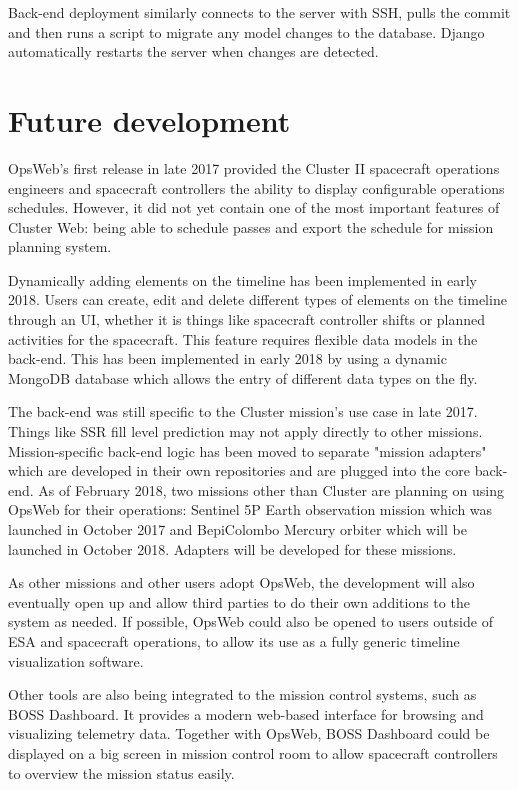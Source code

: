 Back-end deployment similarly connects to the server with SSH, pulls the commit and then runs a script to migrate any model changes to the database. Django automatically restarts the server when changes are detected.
\section{Future development}
OpsWeb's first release in late 2017 provided the Cluster II spacecraft operations engineers and spacecraft controllers the ability to display configurable operations schedules. However, it did not yet contain one of the most important features of Cluster Web: being able to schedule passes and export the schedule for mission planning system.

Dynamically adding elements on the timeline has been implemented in early 2018. Users can create, edit and delete different types of elements on the timeline through an UI, whether it is things like spacecraft controller shifts or planned activities for the spacecraft. This feature requires flexible data models in the back-end. This has been implemented in early 2018 by using a dynamic MongoDB database which allows the entry of different data types on the fly.

The back-end was still specific to the Cluster mission's use case in late 2017. Things like SSR fill level prediction may not apply directly to other missions. Mission-specific back-end logic has been moved to separate "mission adapters" which are developed in their own repositories and are plugged into the core back-end. As of February 2018, two missions other than Cluster are planning on using OpsWeb for their operations: Sentinel 5P Earth observation mission which was launched in October 2017 and BepiColombo Mercury orbiter which will be launched in October 2018. Adapters will be developed for these missions.

As other missions and other users adopt OpsWeb, the development will also eventually open up and allow third parties to do their own additions to the system as needed. If possible, OpsWeb could also be opened to users outside of ESA and spacecraft operations, to allow its use as a fully generic timeline visualization software.

Other tools are also being integrated to the mission control systems, such as BOSS Dashboard. \cite{boss} It provides a modern web-based interface for browsing and visualizing telemetry data. Together with OpsWeb, BOSS Dashboard could be displayed on a big screen in mission control room to allow spacecraft controllers to overview the mission status easily.